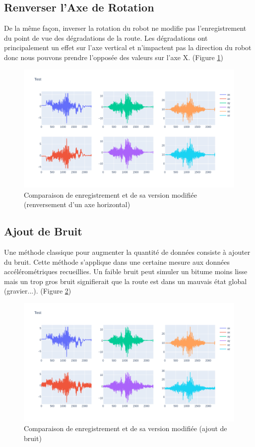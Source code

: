 \subsection{Renverser l'Axe de Rotation}
De la même façon, inverser la rotation du robot ne modifie pas l'enregistrement du point de vue des dégradations de la route. Les dégradations ont principalement un effet sur l'axe vertical et n'impactent pas la direction du robot donc nous pouvons prendre l'opposée des valeurs sur l'axe X. (Figure \ref{data_augmentation_2})

\begin{figure}
    \center
    \includegraphics[scale=0.5]{img/inverted_data.png}
    \caption{Comparaison de enregistrement et de sa version modifiée (renversement d'un axe horizontal)}
    \label{data_augmentation_2}
\end{figure}

\subsection{Ajout de Bruit}
Une méthode classique pour augmenter la quantité de données consiste à ajouter du bruit. Cette méthode s'applique dans une certaine mesure aux données accélérométriques recueillies. Un faible bruit peut simuler un bitume moins lisse mais un trop gros bruit signifierait que la route est dans un mauvais état global (gravier...). (Figure \ref{data_augmentation_3})

\begin{figure}
    \center
    \includegraphics[scale=0.5]{img/noisy_data.png}
    \caption{Comparaison de enregistrement et de sa version modifiée (ajout de bruit)}
    \label{data_augmentation_3}
\end{figure}

